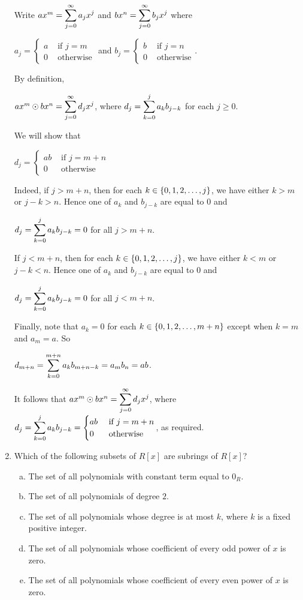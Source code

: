 \documentclass[11pt,fleqn,dvipsnames,usenames]{article}
\begin{document}
\begin{enumerate}[1.]
\solution Write $ax^{m} = \displaystyle\sum\limits_{j=0}^{\infty}a_{j}x^{j}$ and $bx^{n} = \displaystyle\sum\limits_{j=0}^{\infty}b_{j}x^{j}$ where
\begin{center}
$a_{j} = \begin{cases}a&\text{ if }j=m\\0&\text{ otherwise}\end{cases}$ and $b_{j} = \begin{cases}b&\text{ if }j=n\\0&\text{ otherwise}\end{cases}$.
\end{center}
By definition,
\begin{center}
$ax^{m}\odot bx^{n} = \displaystyle\sum\limits_{j=0}^{\infty}d_{j}x^{j}$, where $d_{j} = \displaystyle\sum\limits_{k=0}^{j}a_{k}b_{j-k}$ for each $j\geq 0$.
\end{center}
We will show that
\begin{center}
$d_{j} = \begin{cases}ab & \text{ if }j = m+n\\0&\text{ otherwise }\end{cases}$
\end{center}
Indeed, if $j > m + n$, then for each $k\in\left\{0,1,2,\ldots, j\right\}$, we have either $k > m$ or $j-k > n$.  Hence one of
$a_{k}$ and $b_{j-k}$ are equal to $0$ and 
\begin{center}
$d_{j} = \displaystyle\sum\limits_{k=0}^{j}a_{k}b_{j-k} = 0$ for all $j > m+n$.
\end{center}
If $j < m + n$, then for each $k\in\left\{0,1,2,\ldots, j\right\}$, we have either $k < m$ or $j-k < n$. Hence one of $a_{k}$ and $b_{j-k}$ are equal to $0$ and
\begin{center}
$d_{j} = \displaystyle\sum\limits_{k=0}^{j}a_{k}b_{j-k} = 0$ for all $j < m+n$.
\end{center}
Finally, note that $a_{k} = 0$ for each $k\in\left\{0,1,2,\ldots,m+n\right\}$ except when $k=m$ and $a_{m} = a$.  So
\begin{center}
$d_{m+n} = \displaystyle\sum\limits_{k=0}^{m+n}a_{k}b_{m+n - k} = a_{m}b_{n} = ab$.
\end{center}
It follows that $ax^{m}\odot bx^{n} = \displaystyle\sum\limits_{j=0}^{\infty}d_{j}x^{j}$, where $d_{j} = \displaystyle\sum\limits_{k=0}^{j}a_{k}b_{j-k} = \begin{cases}ab & \text{ if }j=m+n\\0&\text{ otherwise}\end{cases}$, as required.

\item Which of the following subsets of $R[x]$ are subrings of $R[x]$?
\begin{enumerate}[(a)]
\item The set of all polynomials with constant term equal to $0_{R}$.
\item The set of all polynomials of degree $2$.
\item The set of all polynomials whose degree is at most $k$, where $k$ is a fixed positive integer.
\item The set of all polynomials whose coefficient of every odd power of $x$ is zero.
\item The set of all polynomials whose coefficient of every even power of $x$ is zero.
\end{enumerate}
\vsmsp


\end{enumerate}
\end{document}
